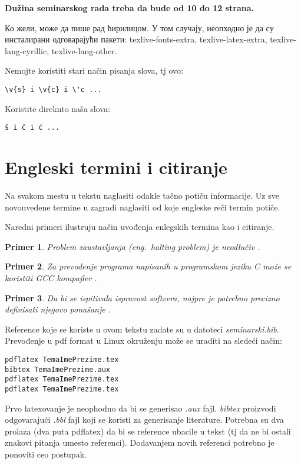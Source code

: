 \documentclass[a4paper]{article}
\newtheorem{primer}{Primer}[section]
\begin{document}
\textbf{Dužina seminarskog rada treba da bude od 10 do 12 strana.}

Ко жели, може да пише рад ћирилицом. У том случају, неопходно је да су инсталирани одговарајући пакети: texlive-fonts-extra, texlive-latex-extra, texlive-lang-cyrillic, texlive-lang-other. 

Nemojte koristiti stari način pisanja slova, tj ovo:
\begin{verbatim}
\v{s} i \v{c} i \'c ...
\end{verbatim}
Koristite direknto naša slova:	
\begin{verbatim}
š i č i ć ... 
\end{verbatim}


\section{Engleski termini i citiranje}	
\label{sec:termini_i_citiranje}

Na svakom mestu u tekstu naglasiti odakle tačno potiču informacije. Uz sve novouvedene termine u zagradi naglasiti od koje engleske reči termin potiče. 

Naredni primeri ilustruju način uvođenja enlegskih termina kao i citiranje.

\begin{primer}
Problem zaustavljanja (eng.~{\em halting problem}) je neodlučiv \cite{haltingproblem}.
\end{primer}

\begin{primer}
Za prevođenje programa napisanih u programskom jeziku C može se koristiti GCC kompajler \cite{gcc}.
\end{primer}

\begin{primer}
 Da bi se ispitivala ispravost softvera, najpre je potrebno precizno definisati njegovo ponašanje \cite{laski2009software}. 
\end{primer}

Reference koje se koriste u ovom tekstu zadate su u datoteci {\em seminarski.bib}. Prevođenje u pdf format u Linux okruženju može se uraditi na sledeći način:
\begin{verbatim}
pdflatex TemaImePrezime.tex 
bibtex TemaImePrezime.aux 
pdflatex TemaImePrezime.tex 
pdflatex TemaImePrezime.tex 
\end{verbatim}
Prvo latexovanje je neophodno da bi se generisao {\em .aux} fajl. {\em bibtex} proizvodi odgovarajući {\em .bbl} fajl koji se koristi za generisanje literature. 
Potrebna su dva prolaza (dva puta pdflatex) da bi se reference ubacile u tekst (tj da ne bi ostali znakovi pitanja umesto referenci). Dodavanjem novih referenci potrebno je ponoviti ceo postupak.  
\end{document}
